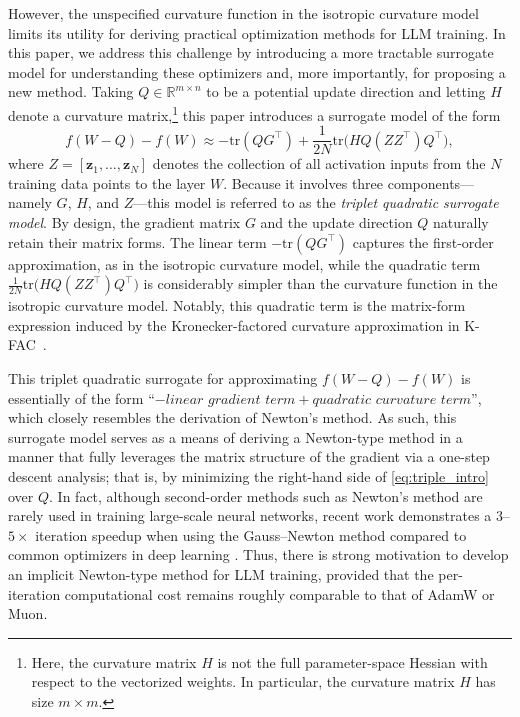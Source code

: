 \documentclass[11pt]{article}
\newcommand{\R}{\mathbb{R}}
\begin{document}
However, the unspecified curvature function in the isotropic curvature model limits its utility for deriving practical optimization methods for LLM training. In this paper, we address this challenge by introducing a more tractable surrogate model for understanding these optimizers and, more importantly, for proposing a new method. Taking $Q\in\R^{m\times n}$ to be a potential update direction and letting $H$ denote a curvature matrix,\footnote{Here, the curvature matrix $H$ is not the full parameter-space Hessian with respect to the vectorized weights. In particular, the curvature matrix $H$ has size $m \times m$.} this paper introduces a surrogate model of the form
\begin{equation}\label{eq:triple_intro}
f(W - Q) - f(W) \approx -\mathrm{tr}({Q}{G}^\top)
  + \frac{1}{2N} \mathrm{tr} \Big({H} {Q} ({Z}{Z}^\top) {Q}^\top\Big),
\end{equation}
where $Z = [\boldsymbol{z}_1, \ldots, \boldsymbol{z}_N]$ denotes the collection of all activation inputs from the $N$ training data points to the layer $W$. Because it involves three components---namely $G$, $H$, and $Z$---this model is referred to as the \textit{triplet quadratic surrogate model}. By design, the gradient matrix $G$ and the update direction $Q$ naturally retain their matrix forms. The linear term $-\mathrm{tr}({Q}{G}^\top)$ captures the first-order approximation, as in the isotropic curvature model, while the quadratic term $\frac{1}{2N} \mathrm{tr} \Big({H} {Q} ({Z}{Z}^\top) {Q}^\top\Big)$ is considerably simpler than the curvature function in the isotropic curvature model. Notably, this quadratic term is the matrix-form expression induced by the Kronecker-factored curvature approximation in K-FAC~\citep{martens2015optimizing}.
 
This triplet quadratic surrogate for approximating $f(W - Q) - f(W)$ is essentially of the form ``$-\textit{linear gradient term} + \textit{quadratic curvature term}$'', which closely resembles the derivation of Newton's method. As such, this surrogate model serves as a means of deriving a Newton-type method in a manner that fully leverages the matrix structure of the gradient via a one-step descent analysis; that is, by minimizing the right-hand side of \eqref{eq:triple_intro} over $Q$. In fact, although second-order methods such as Newton's method are rarely used in training large-scale neural networks, recent work demonstrates a $3$--$5\times$ iteration speedup when using the Gauss--Newton method compared to common optimizers in deep learning \citep{abreu2025potential}. Thus, there is strong motivation to develop an implicit Newton-type method for LLM training, provided that the per-iteration computational cost remains roughly comparable to that of AdamW or Muon.
 
\end{document}
